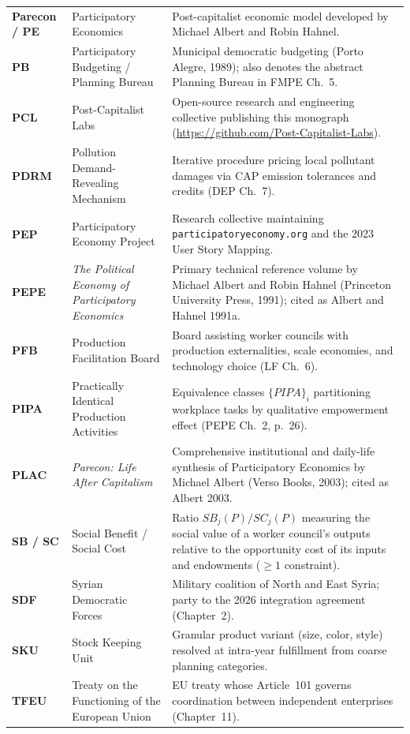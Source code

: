\documentclass[10pt,twoside,openany]{book}
\theoremstyle{dpepstyle}
\begin{document}
{\begin{longtable}{L{0.92in} L{1.75in} L{1.95in}}
\textbf{Parecon / PE} & Participatory Economics & Post-capitalist economic model developed by Michael Albert and Robin Hahnel. \\
\textbf{PB} & Participatory Budgeting / Planning Bureau & Municipal democratic budgeting (Porto Alegre, 1989); also denotes the abstract Planning Bureau in FMPE Ch.~5. \\
\textbf{PCL} & Post-Capitalist Labs & Open-source research and engineering collective publishing this monograph (\url{https://github.com/Post-Capitalist-Labs}). \\
\textbf{PDRM} & Pollution Demand-Revealing Mechanism & Iterative procedure pricing local pollutant damages via CAP emission tolerances and credits (DEP Ch.~7). \\
\textbf{PEP} & Participatory Economy Project & Research collective maintaining \texttt{participatoryeconomy.org} and the 2023 User Story Mapping. \\
\textbf{PEPE} & \emph{The Political Economy of Participatory Economics} & Primary technical reference volume by Michael Albert and Robin Hahnel (Princeton University Press, 1991); cited as Albert and Hahnel 1991a. \\
\textbf{PFB} & Production Facilitation Board & Board assisting worker councils with production externalities, scale economies, and technology choice (LF Ch.~6). \\
\textbf{PIPA} & Practically Identical Production Activities & Equivalence classes $\{PIPA\}_i$ partitioning workplace tasks by qualitative empowerment effect (PEPE Ch.~2, p.~26). \\
\textbf{PLAC} & \emph{Parecon: Life After Capitalism} & Comprehensive institutional and daily-life synthesis of Participatory Economics by Michael Albert (Verso Books, 2003); cited as Albert 2003. \\
\textbf{SB / SC} & Social Benefit / Social Cost & Ratio $SB_j(P)/SC_j(P)$ measuring the social value of a worker council's outputs relative to the opportunity cost of its inputs and endowments ($\ge 1$ constraint). \\
\textbf{SDF} & Syrian Democratic Forces & Military coalition of North and East Syria; party to the 2026 integration agreement (Chapter~2). \\
\textbf{SKU} & Stock Keeping Unit & Granular product variant (size, color, style) resolved at intra-year fulfillment from coarse planning categories. \\
\textbf{TFEU} & Treaty on the Functioning of the European Union & EU treaty whose Article~101 governs coordination between independent enterprises (Chapter~11). \\

\end{longtable}}
\end{document}
